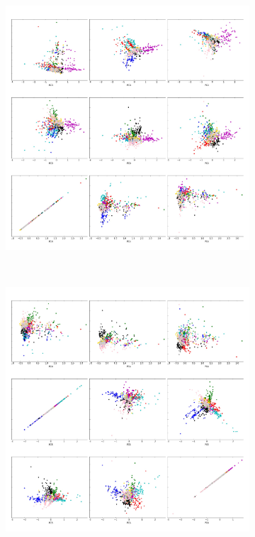 \begin{figure}[ht!]
	\begin{subfigure}[b]{0.45\textwidth}
		\includegraphics[width=\linewidth]{img/sanger/9dim-COLLAGE3}
	\end{subfigure}%
	~
	\begin{subfigure}[b]{0.45\textwidth}
		\includegraphics[width=\linewidth]{img/sanger/9dim-COLLAGE4}
	\end{subfigure}%
	

\end{figure}
